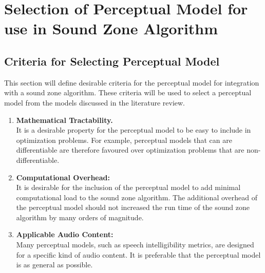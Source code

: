 \section{Selection of Perceptual Model for use in Sound Zone Algorithm}
\subsection{Criteria for Selecting Perceptual Model}
This section will define desirable criteria for the perceptual model for integration with a sound zone algorithm.
These criteria will be used to select a perceptual model from the models discussed in the literature review.
\begin{enumerate}
    \item \textbf{Mathematical Tractability.}\\
        It is a desirable property for the perceptual model to be easy to include in optimization problems.
        For example, perceptual models that can are differentiable are therefore favoured over optimization problems
        that are non-differentiable.
    \item \textbf{Computational Overhead:}\\
        It is desirable for the inclusion of the perceptual model to add minimal computational load 
        to the sound zone algorithm.
        The additional overhead of the perceptual model should not increased the run time of the sound zone algorithm by many orders of magnitude.
    \item \textbf{Applicable Audio Content:}\\
        Many perceptual models, such as speech intelligibility metrics, are designed for a specific kind of audio content.
        It is preferable that the perceptual model is as general as possible.
\end{enumerate}
